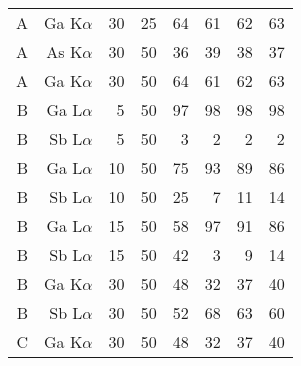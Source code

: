 \begin{table}[phtb]
\begin{center}
\begin{tabular}{rrrrrrrr}
            A               & Ga K$\alpha$  & 30             & 25             & 64                    & 61                     & 62                     & 63                     \\
            A               & As K$\alpha$  & 30             & 50             & 36                    & 39                     & 38                     & 37                     \\
            A               & Ga K$\alpha$  & 30             & 50             & 64                    & 61                     & 62                     & 63                     \\
            \hline
            B               & Ga L$\alpha$  & 5              & 50             & 97                    & 98                     & 98                     & 98                     \\
            B               & Sb L$\alpha$  & 5              & 50             & 3                     & 2                      & 2                      & 2                      \\
            B               & Ga L$\alpha$  & 10             & 50             & 75                    & 93                     & 89                     & 86                     \\
            B               & Sb L$\alpha$  & 10             & 50             & 25                    & 7                      & 11                     & 14                     \\
            B               & Ga L$\alpha$  & 15             & 50             & 58                    & 97                     & 91                     & 86                     \\
            B               & Sb L$\alpha$  & 15             & 50             & 42                    & 3                      & 9                      & 14                     \\
            B               & Ga K$\alpha$  & 30             & 50             & 48                    & 32                     & 37                     & 40                     \\
            B               & Sb L$\alpha$  & 30             & 50             & 52                    & 68                     & 63                     & 60                     \\
            \hline
            C               & Ga K$\alpha$  & 30             & 50             & 48                    & 32                     & 37                     & 40                     \\

\end{tabular}
\end{center}
\end{table}
